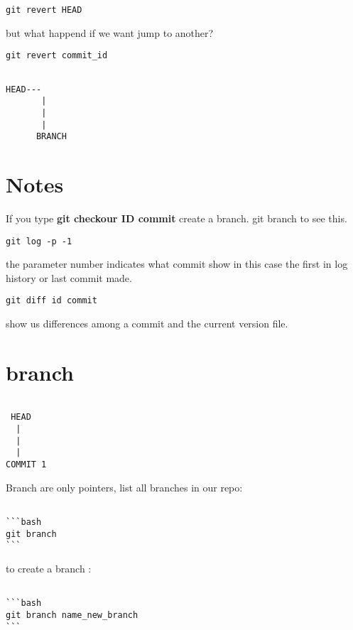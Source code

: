 \documentclass[10pt,a4paper]{article}
\begin{document}
\begin{verbatim}
git revert HEAD
\end{verbatim}

but what happend if we want jump to another?


\begin{verbatim}
git revert commit_id
\end{verbatim}


\begin{verbatim}

HEAD---
	   |
	   |
	   | 
	  BRANCH

\end{verbatim}





\section{Notes}
If you type \textbf{git checkour ID commit}
create a branch.
git branch to see this.


\begin{verbatim}
git log -p -1
\end{verbatim}

the parameter number indicates what commit show in this case the first in log history or last commit made.


\begin{verbatim}
git diff id commit
\end{verbatim}

show us differences among a commit and the current version file.


\section{branch}

\begin{verbatim}

 HEAD
  |
  |
  |
COMMIT 1

\end{verbatim} 

Branch are only pointers, list all branches in our repo:
\begin{verbatim}

```bash
git branch 
```

\end{verbatim}


to create a branch :
\begin{verbatim}

```bash
git branch name_new_branch
```
\end{verbatim}
\end{document}
